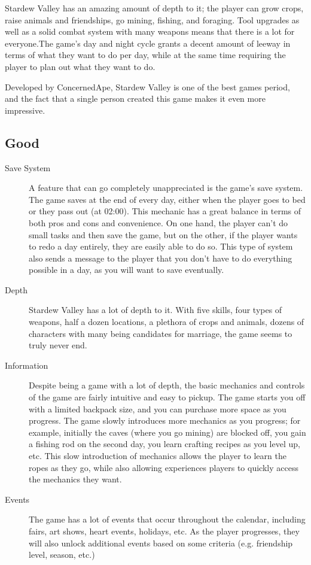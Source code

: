 \documentclass{article}
\begin{document}
Stardew Valley has an amazing amount of depth to it; the player can grow crops,
raise animals and friendships, go mining, fishing, and foraging. Tool upgrades
as well as a solid combat system with many weapons means that there is a lot for
everyone.The game's day and night cycle grants a decent amount of leeway in
terms of what they want to do per day, while at the same time requiring the
player to plan out what they want to do.

Developed by ConcernedApe, Stardew Valley is one of the best games period, and
the fact that a single person created this game makes it even more impressive.

\subsection{Good}
\begin{description}
      \item[Save System] A feature that can go completely unappreciated is the
            game's save system. The game saves at the end of every day, either when
            the player goes to bed or they pass out (at 02:00). This mechanic
            has a great balance in terms of both pros and cons and convenience.
            On one hand, the player can't do small tasks and then save the
            game, but on the other, if the player wants to redo a day entirely,
            they are easily able to do so.
            This type of system also sends a message to the player that you
            don't have to do everything possible in a day, as you will want to
            save eventually.
      \item[Depth] Stardew Valley has a lot of depth to it. With five skills,
            four types of weapons, half a dozen locations, a plethora of crops and
            animals, dozens of characters with many being candidates for marriage, the
            game seems to truly never end.
      \item[Information] Despite being a game with a lot of depth, the basic
            mechanics and controls of the game are fairly intuitive and easy to
            pickup. The game starts you off with a limited backpack size, and
            you can purchase more space as you progress. The game slowly
            introduces more mechanics as you progress; for example, initially
            the caves (where you go mining) are blocked off, you gain a fishing
            rod on the second day, you learn crafting recipes as you level up,
            etc. This slow introduction of mechanics allows the player to learn
            the ropes as they go, while also allowing experiences players to
            quickly access the mechanics they want.
      \item[Events] The game has a lot of events that occur throughout the
            calendar, including fairs, art shows, heart events, holidays, etc.
            As the player progresses, they will also unlock additional events
            based on some criteria (e.g. friendship level, season, etc.)
\end{description}
\end{document}
